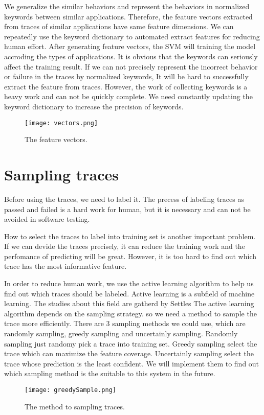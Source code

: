 We generalize the similar behaviors and represent the behaviors in normalized keywords between similar applications.
Therefore, the feature vectors extracted from traces of similar applications have same feature dimensions.
We can repeatedly use the keyword dictionary to automated extract features for reducing human effort.
After generating feature vectors, the SVM will training the model accroding the types of applications.
It is obvious that the keywords can seriously affect the training result.
If we can not precisely represent the incorrect behavior or failure in the traces by normalized keywords,
It will be hard to successfully extract the feature from traces.
However, the work of collecting keywords is a heavy work and can not be quickly complete.
We need constantly updating the keyword dictionary to increase the precision of keywords.

\begin{figure}[ht]
	\graphicspath{{pic/}}
	\begin{center}
		\texttt{[image: vectors.png]}
	\end{center}
	\caption{ The feature vectors. }
	\label{featureVectors}
\end{figure}


\clearpage

\section{Sampling traces}

Before using the traces, we need to label it.
The precess of labeling traces as passed and failed is a hard work for human,
but it is necessary and can not be avoided in software testing.

How to select the traces to label into training set is another important problem.
If we can devide the traces precisely,
it can reduce the training work and the perfomance of predicting will be great.
However, it is too hard to find out which trace has the most informative feature.

In order to reduce human work,
we use the active learning algorithm to help us find out which traces should be labeled.
Active learning is a subfield of machine learning.
The studies about this field are gatherd by Settles\cite{ActiveLearning}
The active learning algorithm depends on the sampling strategy.
so we need a method to sample the trace more efficiently.
There are 3 sampling methods we could use, which are randomly sampling, greedy sampling and uncertainly sampling.
Randomly sampling just randomy pick a trace into training set.
Greedy sampling select the trace which can maximize the feature coverage.
Uncertainly sampling  select the trace whose prediction is the least confident.
We will implement them to find out which sampling method is the suitable to this system in the future.


\begin{figure}[ht]
	\graphicspath{{pic/}}
	\begin{center}
		\texttt{[image: greedySample.png]}
	\end{center}
	\caption{ The method to sampling traces. }
	\label{greedySample}
\end{figure}


